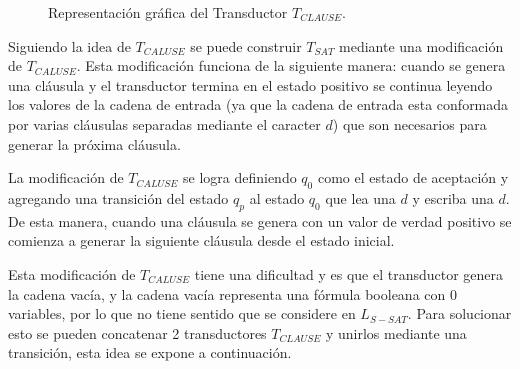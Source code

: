 \begin{figure}[h]
    \centering  \begin{otherlanguage}{english}
    \end{otherlanguage}
    \caption{Representación gráfica del Transductor $T_{CLAUSE}$.}
    \label{fig:transducer_clause} %
\end{figure}

Siguiendo la idea de $T_{CALUSE}$ se puede construir $T_{SAT}$ mediante una modificación de $T_{CALUSE}$.
Esta modificación funciona de la siguiente manera: cuando se genera una cláusula y el transductor termina en el estado positivo se continua leyendo los valores de la cadena de entrada (ya que la cadena de entrada esta conformada por varias cláusulas separadas mediante el caracter $d$) que son necesarios para generar la próxima cláusula. 

La modificación de $T_{CALUSE}$ se logra definiendo $q_0$ como el estado de aceptación y agregando una transición 
del estado $q_p$ al estado $q_0$ que lea una $d$ y escriba una $d$. De esta manera, cuando una cláusula se genera 
con un valor de verdad positivo se comienza a generar la siguiente cláusula desde el estado inicial.

Esta modificación de $T_{CALUSE}$ tiene una dificultad y es que el transductor genera la cadena vacía, y la cadena vacía representa una fórmula booleana con 0 variables, por lo que no tiene sentido que se considere en $L_{S-SAT}$. Para solucionar esto se pueden concatenar 2 transductores $T_{CLAUSE}$ y unirlos mediante una transición, esta idea se expone a continuación.

